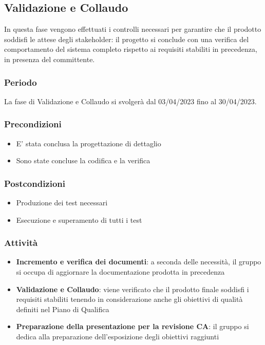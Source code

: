 \subsection{Validazione e Collaudo}
In questa fase vengono effettuati i controlli necessari per garantire che il prodotto soddisfi le attese degli stakeholder: il progetto si conclude con una verifica del comportamento del sistema completo rispetto ai requisiti stabiliti in precedenza, in presenza del committente.

\subsubsection{Periodo}
La fase di Validazione e Collaudo si svolgerà dal 03/04/2023 fino al 30/04/2023.

\subsubsection{Precondizioni}
\begin{itemize}
    \item E’ stata conclusa la progettazione di dettaglio
    \item Sono state concluse la codifica e la verifica
\end{itemize}

\subsubsection{Postcondizioni}
\begin{itemize}
    \item Produzione dei test necessari
    \item Esecuzione e superamento di tutti i test
\end{itemize}

\subsubsection{Attività}
\begin{itemize}
    \item \textbf{Incremento e verifica dei documenti}: a seconda delle necessità, il gruppo si occupa di aggiornare la documentazione prodotta in precedenza
    \item \textbf{Validazione e Collaudo}: viene verificato che il prodotto finale soddisfi i requisiti stabiliti tenendo in considerazione anche gli obiettivi di qualità definiti nel Piano di Qualifica
    \item \textbf{Preparazione della presentazione per la revisione CA}: il gruppo si dedica alla preparazione dell’esposizione degli obiettivi raggiunti
\end{itemize}


